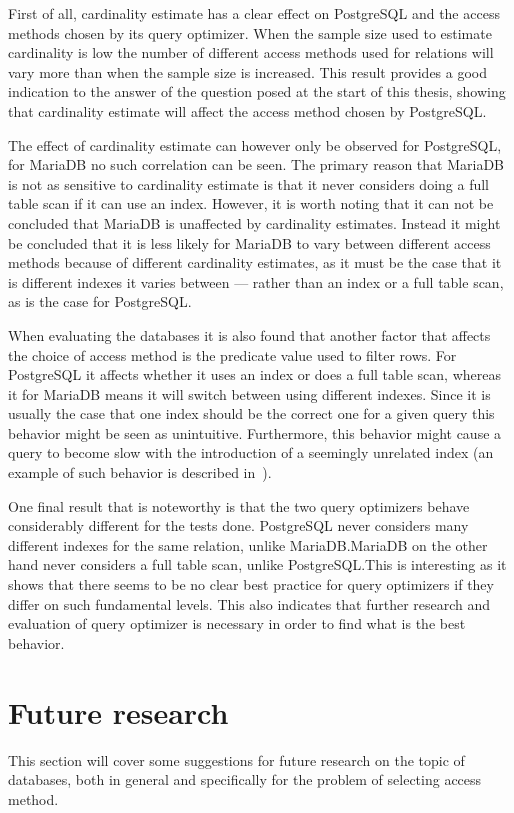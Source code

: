 First of all, cardinality estimate has a clear effect on PostgreSQL and the
access methods chosen by its query optimizer. When the sample size used to
estimate cardinality is low the number of different access methods used for
relations will vary more than when the sample size is increased. This
result provides a good indication to the answer of the question posed at the
start of this thesis, showing that cardinality estimate will affect the access
method chosen by PostgreSQL.\@

The effect of cardinality estimate can however only be observed for PostgreSQL,
for MariaDB no such correlation can be seen. The primary reason that MariaDB is
not as sensitive to cardinality estimate is that it never considers doing a full
table scan if it can use an index. However, it is worth noting that it can not
be concluded that MariaDB is unaffected by cardinality estimates. Instead it
might be concluded that it is less likely for MariaDB to vary between different
access methods because of different cardinality estimates, as it must be the
case that it is different indexes it varies between --- rather than an index or
a full table scan, as is the case for PostgreSQL.\@

When evaluating the databases it is also found that another factor that affects
the choice of access method is the predicate value used to filter rows. For
PostgreSQL it affects whether it uses an index or does a full table scan,
whereas it for MariaDB means it will switch between using different indexes.
Since it is usually the case that one index should be the correct one for a
given query this behavior might be seen as unintuitive. Furthermore, this
behavior might cause a query to become slow with the introduction of a seemingly
unrelated index (an example of such behavior is described
in~\cite[Ch.~14]{lahdenmaki_2005_relational_rdidatodossea}).

One final result that is noteworthy is that the two query optimizers behave
considerably different for the tests done. PostgreSQL never considers
many different indexes for the same relation, unlike MariaDB.\@ MariaDB on the
other hand never considers a full table scan, unlike PostgreSQL.\@ This is
interesting as it shows that there seems to be no clear best practice for query
optimizers if they differ on such fundamental levels. This also indicates that
further research and evaluation of query optimizer is necessary in order to find
what is the best behavior.

\section{Future research}
This section will cover some suggestions for future research on the topic of
databases, both in general and specifically for the problem of selecting access method.

